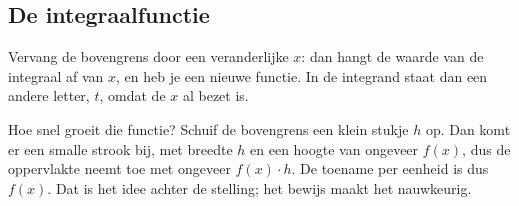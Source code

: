 \subsection{De integraalfunctie}

Vervang de bovengrens door een veranderlijke $x$: dan hangt de waarde van de integraal af van $x$, en heb je een nieuwe functie. In de integrand staat dan een andere letter, $t$, omdat de $x$ al bezet is.

Hoe snel groeit die functie? Schuif de bovengrens een klein stukje $h$ op. Dan komt er een smalle strook bij, met breedte $h$ en een hoogte van ongeveer $f(x)$, dus de oppervlakte neemt toe met ongeveer $f(x) \cdot h$. De toename per eenheid is dus $f(x)$. Dat is het idee achter de stelling; het bewijs maakt het nauwkeurig.

